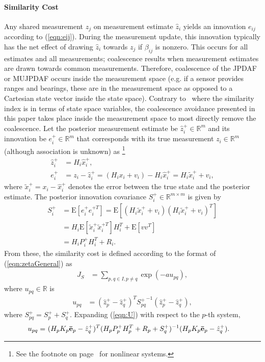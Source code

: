 \documentclass[letterpaper, paper,10pt]{AAS}		%
\newcommand{\refeqn}[1]{(\ref{eqn:#1})}
\renewcommand{\Re}{\ensuremath{\mathbb{R}}}
\begin{document}
\paragraph*{Similarity Cost}
Any shared measurement $z_j$ on measurement estimate $\hat z_i$ yields an innovation $e_{ij}$ according to \refeqn{eij}.
During the measurement update, this innovation typically has the net effect of drawing $\hat z_i$ towards $z_j$ if $\beta_{ij}$ is nonzero.
This occurs for all estimates and all measurements; coalescence results when measurement estimates are drawn towards common measurements.
Therefore, coalescence of the JPDAF or MUJPDAF occurs inside the measurement space (e.g. if a sensor provides ranges and bearings, these are in the measurement space as opposed to a Cartesian state vector inside the state space).
Contrary to~\cite{KauLovLee14} where the similarity index is in terms of state space variables, the coalescence avoidance presented in this paper takes place inside the measurement space to most directly remove the coalescence.
Let the posterior measurement estimate be $\hat z_i^+\in\Re^m$ and its innovation be $e_{i}^+\in\Re^m$ that corresponds with its true measurement $z_i\in\Re^m$ (although association is unknown) as
\footnote{See the footnote on page~\pageref{fn:nonlinsys} for nonlinear systems.}
\begin{align}
\hat z_i^+&=H_i\hat x_i^+,
\\
e_{i}^+&=z_i-\hat z_i^+=(H_ix_i+v_i)-H_i\hat x_{i}^+=H_i\tilde x_i^++v_i,
\end{align}
where $\tilde x_i^+=x_i-\hat x_{i}^+$ denotes the error between the true state and the posterior estimate. The posterior innovation covariance $S^+_i\in\Re^{m\times m}$ is given by
\begin{align}
S^+_i&=\mathrm{E}[e_i^+e_i^{+T}]=\mathrm{E}[(H_i\tilde x_i^++v_i)(H_i\tilde x_i^++v_i)^T]\nonumber
\\
&=H_i\mathrm{E}[\tilde x_i^+\tilde x_i^{+T}]H_i^T+\mathrm{E}[vv^T]\nonumber%
\\
&=H_iP^+_iH_i^T+R_i.
\end{align}
From these, the similarity cost is defined according to the format of \refeqn{zetaGeneral} as
\begin{align}
\label{eqn:Js}
J_S&=\sum\limits_{p,q\in I,p\neq q}\exp (-au_{pq}),
\end{align}
where $u_{pq}\in\Re$ is
\begin{align}
u_{pq} & = (\hat z_{p}^+-\hat z^+_{q})^T{S^+_{pq}}^{-1}(\hat z^+_{p}-\hat z^+_{q})\label{eqn:U},
\end{align}
where $S^+_{pq}=S^+_{p}+S^+_{q}$. Expanding \refeqn{U} with respect to the $p$-th system,
\begin{align}
u_{pq}=&\ 
(H_pK_p{\bf\bar e}_p-\hat z^+_{q})^T
(H_pP^+_{p}H_p^T+R_p+S^+_q)^{-1}  
(H_pK_p{\bf\bar e}_p-\hat z^+_{q}).
\end{align}
\end{document}
